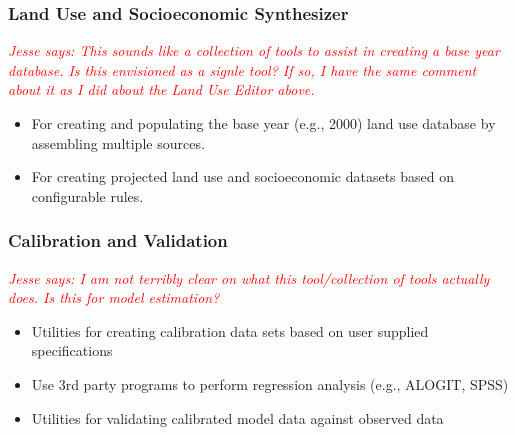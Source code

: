 \documentclass[titlepage]{article}
\begin{document}
\subsubsection{Land Use and Socioeconomic Synthesizer}
\textcolor{red}{\textit{Jesse says: This sounds like a collection of tools to assist in creating a base year database.  Is this envisioned as a signle tool?  If so, I have the same comment about it as I did about the Land Use Editor above.}}
\begin{itemize}
	\item For creating and populating the base year (e.g., 2000) land use database by assembling multiple sources.
	\item For creating projected land use and socioeconomic datasets based on configurable rules. 
\end{itemize}

\subsubsection{Calibration and Validation}
\textcolor{red}{\textit{Jesse says: I am not terribly clear on what this tool/collection of tools actually does.  Is this for model estimation?}}
\begin{itemize}
	\item Utilities for creating calibration data sets based on user supplied specifications
	\item Use 3rd party programs to perform regression analysis (e.g., ALOGIT, SPSS)
	\item Utilities for validating calibrated model data against observed data
\end{itemize}
\end{document}
